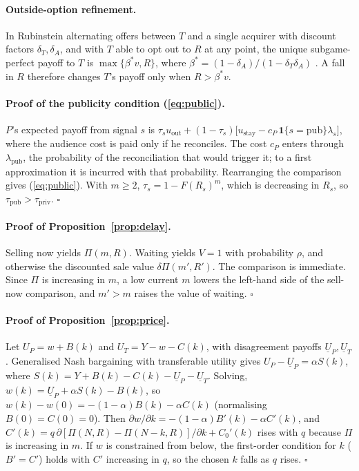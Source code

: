 \paragraph{Outside-option refinement.} In Rubinstein alternating offers between $T$ and a single acquirer with discount factors $\delta_T,\delta_A$, and with $T$ able to opt out to $R$ at any point, the unique subgame-perfect payoff to $T$ is $\max\{\beta^\ast v,R\}$, where $\beta^\ast=(1-\delta_A)/(1-\delta_T\delta_A)$ \citep{rubinstein1982,bss1989}. A fall in $R$ therefore changes $T$'s payoff only when $R>\beta^\ast v$.

\paragraph{Proof of the publicity condition (\ref{eq:public}).} $P$'s expected payoff from signal $s$ is $\tau_s u_{\text{out}}+(1-\tau_s)\big[u_{\text{stay}}-c_P\,\mathbf{1}\{s=\text{pub}\}\lambda_s\big]$, where the audience cost is paid only if he reconciles. The cost $c_P$ enters through $\lambda_{\text{pub}}$, the probability of the reconciliation that would trigger it; to a first approximation it is incurred with that probability. Rearranging the comparison gives (\ref{eq:public}). With $m\ge2$, $\tau_s=1-F(R_s)^m$, which is decreasing in $R_s$, so $\tau_{\text{pub}}>\tau_{\text{priv}}$. $\square$

\paragraph{Proof of Proposition~\ref{prop:delay}.} Selling now yields $\Pi(m,R)$. Waiting yields $V=1$ with probability $\rho$, and otherwise the discounted sale value $\delta\Pi(m',R')$. The comparison is immediate. Since $\Pi$ is increasing in $m$, a low current $m$ lowers the left-hand side of the sell-now comparison, and $m'>m$ raises the value of waiting. $\square$

\paragraph{Proof of Proposition~\ref{prop:price}.} Let $U_P=w+B(k)$ and $U_T=Y-w-C(k)$, with disagreement payoffs $\underline U_P,\underline U_T$. Generalised Nash bargaining with transferable utility gives $U_P-\underline U_P=\alpha S(k)$, where $S(k)=Y+B(k)-C(k)-\underline U_P-\underline U_T$. Solving, $w(k)=\underline U_P+\alpha S(k)-B(k)$, so $w(k)-w(0)=-(1-\alpha)B(k)-\alpha C(k)$ (normalising $B(0)=C(0)=0$). Then $\partial w/\partial k=-(1-\alpha)B'(k)-\alpha C'(k)$, and $C'(k)=q\,\partial[\Pi(N,R)-\Pi(N-k,R)]/\partial k+C_0'(k)$ rises with $q$ because $\Pi$ is increasing in $m$. If $w$ is constrained from below, the first-order condition for $k$ ($B'=C'$) holds with $C'$ increasing in $q$, so the chosen $k$ falls as $q$ rises. $\square$

